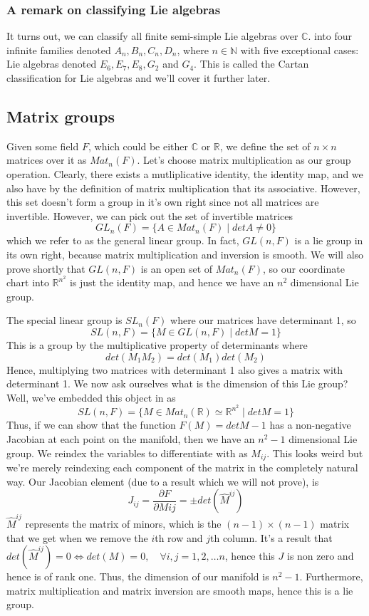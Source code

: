 \documentclass[11pt, oneside]{article}   	%
\theoremstyle{slanted}
\begin{document}
\subsubsection*{A remark on classifying Lie algebras}

It turns out, we can classify all finite semi-simple Lie algebras over $\mathbb{C}$. into four infinite families denoted $A_n, B_n, C_n, D_n$, where $n \in \mathbb{N}$ with five exceptional cases: Lie algebras denoted $E_6, E_7, E_8, G_2$ and $G_4$. This is called the Cartan classification for Lie algebras and we'll cover it further later.  

\subsection{Matrix groups}
Given some field $F$, which could be either $\mathbb{C}$ or $\mathbb{R}$, we define the set of $n \times n$ matrices over it as $Mat_n (F)$. Let's choose matrix multiplication as our group operation. Clearly, there exists a mutliplicative identity, the identity map, and we also have by the definition of matrix multiplication that its associative. However, this set doesn't form a group in it's own right since not all matrices are invertible. However, we can pick out the set of invertible matrices 
\[
	GL_n(F) = \{A \in Mat_n(F) \mid det A \neq 0 \}  
\]
which we refer to as the general linear group. In fact, $GL(n, F)$ is a lie group in its own right, because matrix multiplication and inversion is smooth. We will also prove shortly that $GL(n, F)$ is an open set of $Mat_n(F)$, so our coordinate chart into $\mathbb{R}^{n^2}$ is just the identity map, and hence we have an $n^2$ dimensional Lie group.  

The special linear group is $SL_n(F)$ where our matrices have determinant 1, so 
\[ 
	SL(n, F) = \{ M \in GL(n, F) \mid det M = 1 \} 
\] 
This is a group by the multiplicative property of determinants where 
\[ 
	det(M_1 M_2) = det(M_1)det(M_2)
\] Hence, multiplying two matrices with determinant 1 also gives a matrix with determinant 1. We now ask ourselves what is the dimension of this Lie group? Well, we've embedded this object in as 
\[
	SL(n, F) = \{ M \in Mat_n(\mathbb{ R}) \simeq \mathbb{R}^{ n^2 } \mid det M = 1 \}
\]
Thus, if we can show that the function $F(M) = det M - 1 $ has a non-negative Jacobian at each point on the manifold, then we have an $n^2 - 1$ dimensional Lie group.  
We reindex the variables to differentiate with as $M_{ij}$. This looks weird but we're merely reindexing each component of the matrix in the completely natural way. Our Jacobian element (due to a result which we will not prove), is 
\[ 
	J_{ij}  = \frac{\partial F}{\partial M{ij} } = \pm det ( \hat{M}^{ ij } ) 
\] 
$\hat{M}^{ ij} $ represents the matrix of minors, which is the $(n - 1) \times ( n - 1) $ matrix that we get when we remove the $i$th row and $j$th column. It's a result that $det(\hat{M}^{ ij } )  = 0 \iff det(M) = 0, \quad \forall i, j = 1, 2,\dots n$, hence this $J$ is non zero and hence is of rank one. Thus, the dimension of our manifold is $n^2 -1 $. Furthermore, matrix multiplication and matrix inversion are smooth maps, hence this is a lie group. 
\end{document}
